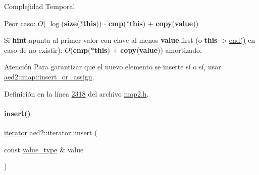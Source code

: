 \begin{DoxyDescription}
\item[Complejidad Temporal]
\begin{DoxyItemize}
\item Peor caso\+: $O$( $\log$({\bfseries size}({\bfseries $\ast$this})) $\cdot$ {\bfseries cmp}({\bfseries $\ast$this}) $+$ {\bfseries copy}({\bfseries value}))
\item Si {\bfseries hint} apunta al primer valor con clave al menos {\bfseries value}.first (o {\bfseries this}-\/$>$\hyperlink{classaed2_1_1iterator_a67caf9468be999e9be96b7add5d79946_a67caf9468be999e9be96b7add5d79946}{end()} en caso de no existir)\+: $O$({\bfseries cmp}({\bfseries $\ast$this}) $+$ {\bfseries copy}({\bfseries value})) amortizado. 
\end{DoxyItemize}
\end{DoxyDescription}

\begin{DoxyAttention}{Atención}
Para garantizar que el nuevo elemento se inserte sí o sí, usar \hyperlink{classaed2_1_1map_a2ef6723c183916276b0afc4a4c721475_a2ef6723c183916276b0afc4a4c721475}{aed2\+::map\+::insert\+\_\+or\+\_\+assign}. 
\end{DoxyAttention}


Definición en la línea \hyperlink{map2_8h_source_l02318}{2318} del archivo \hyperlink{map2_8h_source}{map2.\+h}.

\mbox{\label{classaed2_1_1iterator_aa1870e8bfa4f45c82fa1ee076846922b_aa1870e8bfa4f45c82fa1ee076846922b}} 
\paragraph{\texorpdfstring{insert()}{insert()}\hspace{0.1cm}{\footnotesize\ttfamily [2/2]}}
{\footnotesize\ttfamily \hyperlink{classaed2_1_1iterator_1_1iterator}{iterator} aed2\+::iterator\+::insert (\begin{DoxyParamCaption}\item[{const \hyperlink{classaed2_1_1iterator_a6411a2c08b2b7c52f063bef1a168acb6_a6411a2c08b2b7c52f063bef1a168acb6}{value\+\_\+type} \&}]{value }\end{DoxyParamCaption})\hspace{0.3cm}{\ttfamily [inline]}}


